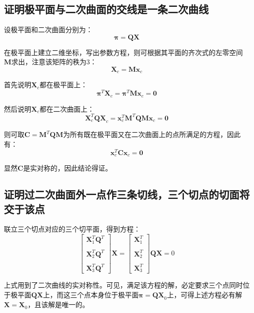 \documentclass[11pt]{article}
\begin{document}
\subsection{证明极平面与二次曲面的交线是一条二次曲线}
\label{subsec:证明极平面与二次曲面的交线是一条二次曲线}
\par
设极平面和二次曲面分别为：
\begin{equation*}
  \mathbold{\pi=QX}
\end{equation*}\par
在极平面上建立二维坐标，写出参数方程，则可根据其平面的齐次式的左零空间$\mathbf{M}$求出，注意该矩阵的秩为3：
\begin{equation*}
  \mathbf{X}_c=\mathbf{Mx}_c
\end{equation*}\par
首先说明$\mathbf{X}_c$都在极平面上：
\begin{equation*}
  \mathbold{\pi}^T\mathbf{X}_c=\mathbold{\pi}^T\mathbf{Mx}_c=\mathbf{0}
\end{equation*}\par
然后说明$\mathbf{X}_c$都在二次曲面上：
\begin{equation*}
  \mathbf{X}_c^T\mathbold{QX}_c=\mathbf{x}_c^T\mathbf{M}^T\mathbold{Q}\mathbf{Mx}_c=\mathbf{0}
\end{equation*}\par
则可取$\mathbf{C=M^\mathit{T}QM}$为所有既在极平面又在二次曲面上的点所满足的方程，因此有：
\begin{equation*}
  \mathbf{x}_c^T\mathbf{C}\mathbf{x}_c=\mathbf{0}
\end{equation*}\par
显然$\mathbf{C}$是实对称的，因此结论得证。
\subsection{证明过二次曲面外一点作三条切线，三个切点的切面将交于该点}
\par
联立三个切点对应的三个切平面，得到方程：
\begin{equation*}
  \begin{bmatrix}
    \mathbf{X}_1^T \mathbf{Q}^T \\\\ \mathbf{X}_2^T \mathbf{Q}^T \\\\ \mathbf{X}_3^T \mathbf{Q}^T
  \end{bmatrix}\mathbf{X}=\begin{bmatrix}
    \mathbf{X}_1^T  \\\\ \mathbf{X}_2^T\\\\ \mathbf{X}_3^T
  \end{bmatrix}\mathbf{QX}=0
\end{equation*}\par
上式用到了二次曲线的实对称性。可见，满足该方程的解，必定要求三个点同时位于极平面$\mathbf{QX}$上，而这三个点本身位于极平面$\mathbold{\pi=QX}_0$上，可得上述方程必有解$\mathbf{X=X}_0$，且该解是唯一的。
\end{document}
